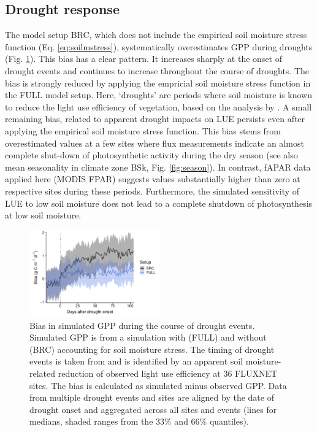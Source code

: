 \documentclass{myreport}
\begin{document}
\subsection{Drought response}
\label{sec:results_droughtresponse}

The model setup BRC, which does not include the empirical soil moisture stress function (Eq. \ref{eq:soilmstress}), systematically overestimates GPP during droughts (Fig. \ref{fig:modobs_droughtresponse}). This bias has a clear pattern. It increases sharply at the onset of drought events and continues to increase throughout the course of droughts. The bias is strongly reduced by applying the empricial soil moisture stress function in the FULL model setup. Here, `droughts' are periods where soil moisture is known to reduce the light use efficiency of vegetation, based on the analysis by \cite{stocker18newphyt}. A small remaining bias, related to apparent drought impacts on LUE persists even after applying the empirical soil moisture stress function. This bias stems from overestimated values at a few sites where flux measurements indicate an almost complete shut-down of photosynthetic activity during the dry season (see also mean seasonality in climate zone BSk, Fig. \ref{fig:season}). In contrast, fAPAR data applied here (MODIS FPAR) suggests values substantially higher than zero at respective sites during these periods. Furthermore, the simulated sensitivity of LUE to low soil moisture does not lead to a complete shutdown of photosynthesis at low soil moisture.

\begin{figure}[!ht]
    \centering
\includegraphics[width=0.5\textwidth]{fig/droughtresponse.pdf}
    \caption{Bias in simulated GPP during the course of drought events. Simulated GPP is from a simulation with (FULL) and without (BRC) accounting for soil moisture stress. The timing of drought events is taken from \cite{stocker18newphyt} and is identified by an apparent soil moisture-related reduction of observed light use efficiency at 36 FLUXNET sites. The bias is calculated as simulated minus observed GPP. Data from multiple drought events and sites are aligned by the date of drought onset and aggregated across all sites and events (lines for medians, shaded ranges from the 33\% and 66\% quantiles).}
    \label{fig:modobs_droughtresponse}
\end{figure}
\end{document}

